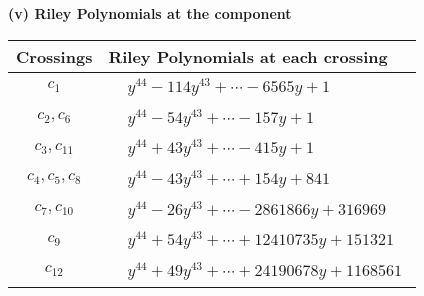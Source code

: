 \documentclass[1p]{elsarticle_modified}
\theoremstyle{definition}
\begin{document}
\flushleft \textbf{(v) Riley Polynomials at the component}\newline \\
\begin{tabular}{m{50pt}|m{274pt}}
Crossings & \hspace{64pt}Riley Polynomials at each crossing \\
\hline $$\begin{aligned}c_{1}\end{aligned}$$&$\begin{aligned}
&y^{44}-114 y^{43}+\cdots-6565 y+1
\end{aligned}$\\
\hline $$\begin{aligned}c_{2},c_{6}\end{aligned}$$&$\begin{aligned}
&y^{44}-54 y^{43}+\cdots-157 y+1
\end{aligned}$\\
\hline $$\begin{aligned}c_{3},c_{11}\end{aligned}$$&$\begin{aligned}
&y^{44}+43 y^{43}+\cdots-415 y+1
\end{aligned}$\\
\hline $$\begin{aligned}c_{4},c_{5},c_{8}\end{aligned}$$&$\begin{aligned}
&y^{44}-43 y^{43}+\cdots+154 y+841
\end{aligned}$\\
\hline $$\begin{aligned}c_{7},c_{10}\end{aligned}$$&$\begin{aligned}
&y^{44}-26 y^{43}+\cdots-2861866 y+316969
\end{aligned}$\\
\hline $$\begin{aligned}c_{9}\end{aligned}$$&$\begin{aligned}
&y^{44}+54 y^{43}+\cdots+12410735 y+151321
\end{aligned}$\\
\hline $$\begin{aligned}c_{12}\end{aligned}$$&$\begin{aligned}
&y^{44}+49 y^{43}+\cdots+24190678 y+1168561
\end{aligned}$\\
\hline
\end{tabular}\\~\\
\end{document}
